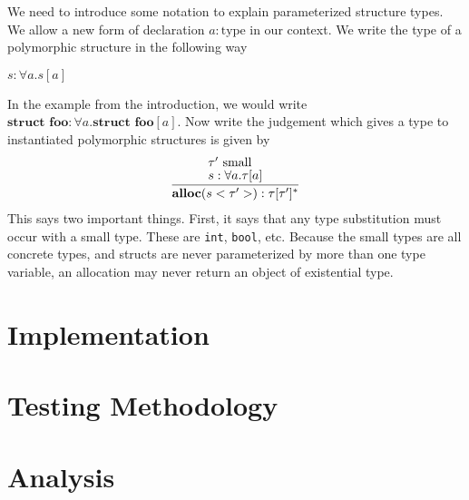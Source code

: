 \documentclass[aps,letterpaper,11pt]{revtex4}
\begin{document}
We need to introduce some notation to explain parameterized structure types. We allow a new form of declaration
$a : \text{type}$ in our context. We write the type of a polymorphic structure in the following way

\begin{center}
$s : \forall a. s[a]$
\end{center}

In the example from the introduction, we would write $\textbf{struct foo} : \forall a. \textbf{struct foo}[a]$.
Now write the judgement which gives a type to instantiated polymorphic structures is given by
\[
\begin{tabular}{c}
  \infer{\textbf{alloc}(s <\tau'>) : \tau[\tau']^*}
        {	
        	{\tau'~\text{small}} \vspace{.1cm}\\
			{s : \forall a. \tau[a]}
        }
\end{tabular}
\]
This says two important things. First, it says that any type substitution must occur with a small type.
These are \texttt{int}, \texttt{bool}, etc. Because the small types are all concrete types, and structs are
never parameterized by more than one type variable, an allocation may never return an object of
existential type.

\newpage
\section{Implementation}

\newpage
\section{Testing Methodology}

\newpage
\section{Analysis}
\end{document}
